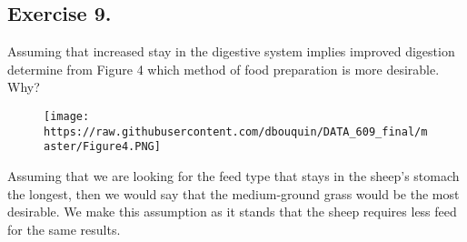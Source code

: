 \documentclass[]{article}
\begin{document}
\subsection{Exercise 9.}\label{exercise-9.}

Assuming that increased stay in the digestive system implies improved
digestion determine from Figure 4 which method of food preparation is
more desirable. Why?

\begin{figure}[htbp]
\centering
\texttt{[image: https://raw.githubusercontent.com/dbouquin/DATA\_609\_final/master/Figure4.PNG]}
\caption{}
\end{figure}

Assuming that we are looking for the feed type that stays in the sheep's
stomach the longest, then we would say that the medium-ground grass
would be the most desirable. We make this assumption as it stands that
the sheep requires less feed for the same results.
\end{document}
